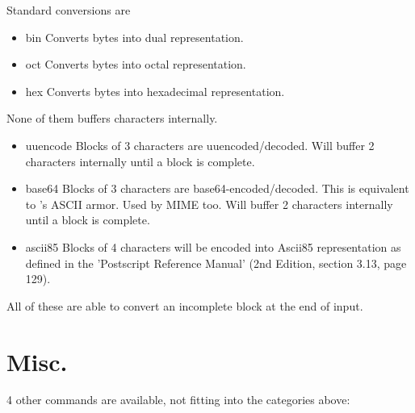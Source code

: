 \documentclass {report}
\begin{document}
Standard conversions are
\begin {itemize}
\item[bin]	Converts bytes into dual representation.
\item[oct]	Converts bytes into octal representation.
\item[hex]	Converts bytes into hexadecimal representation.
\end   {itemize}
None of them buffers characters internally.

\begin {itemize}
\item[uuencode]	Blocks of 3 characters are uuencoded/decoded. Will
		buffer 2 characters internally until a block is complete.
\item[base64]	Blocks of 3 characters are
		base64-encoded/decoded. This is equivalent to \PGP{}'s
		ASCII armor. Used by MIME too. Will buffer 2
		characters internally until a block is complete.
\item[ascii85]	Blocks of 4 characters will be encoded into Ascii85
		representation as defined in the 'Postscript Reference
		Manual' (2nd Edition, section 3.13, page 129).
\end   {itemize}
All of these are able to convert an incomplete block at the end of
input.

\section {Misc.}

4 other commands are available, not fitting into the categories above:
\end{document}
